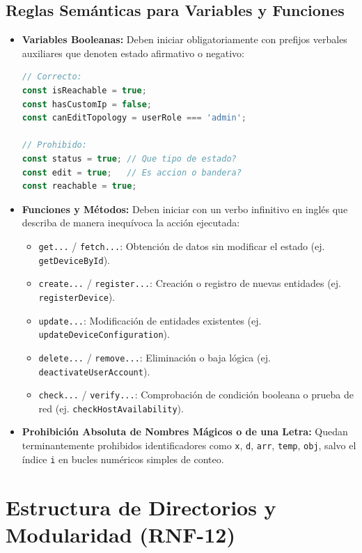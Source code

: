 \documentclass[12pt,a4paper]{report}
\begin{document}
\section{Reglas Semánticas para Variables y Funciones}
\begin{itemize}
  \item \textbf{Variables Booleanas:} Deben iniciar obligatoriamente con prefijos verbales auxiliares que denoten estado afirmativo o negativo:
  \begin{lstlisting}[language=JavaScript]
// Correcto:
const isReachable = true;
const hasCustomIp = false;
const canEditTopology = userRole === 'admin';

// Prohibido:
const status = true; // Que tipo de estado?
const edit = true;   // Es accion o bandera?
const reachable = true;
  \end{lstlisting}

  \item \textbf{Funciones y Métodos:} Deben iniciar con un verbo infinitivo en inglés que describa de manera inequívoca la acción ejecutada:
  \begin{itemize}
    \item \texttt{get...} / \texttt{fetch...}: Obtención de datos sin modificar el estado (ej. \texttt{getDeviceById}).
    \item \texttt{create...} / \texttt{register...}: Creación o registro de nuevas entidades (ej. \texttt{registerDevice}).
    \item \texttt{update...}: Modificación de entidades existentes (ej. \texttt{updateDeviceConfiguration}).
    \item \texttt{delete...} / \texttt{remove...}: Eliminación o baja lógica (ej. \texttt{deactivateUserAccount}).
    \item \texttt{check...} / \texttt{verify...}: Comprobación de condición booleana o prueba de red (ej. \texttt{checkHostAvailability}).
  \end{itemize}

  \item \textbf{Prohibición Absoluta de Nombres Mágicos o de una Letra:} Quedan terminantemente prohibidos identificadores como \texttt{x}, \texttt{d}, \texttt{arr}, \texttt{temp}, \texttt{obj}, salvo el índice \texttt{i} en bucles numéricos simples de conteo.
\end{itemize}

\newpage
\chapter{Estructura de Directorios y Modularidad (RNF-12)}
\end{document}
